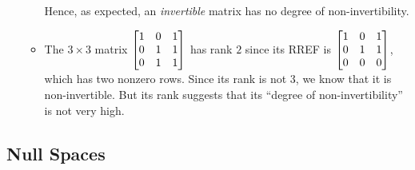 \begin{enumerate}
\begin{itemize}
Hence, as expected, an \emph{invertible} matrix has no degree of
non-invertibility.
\item The \(3\times 3\) matrix \(\mqty[1&0&1\\ 0&1&1\\ 0&1&1]\) has rank \(2\)
since its RREF is \(\mqty[1&0&1\\ 0&1&1\\ 0&0&0]\), which has two nonzero rows.
Since its rank is not \(3\), we know that it is non-invertible. But its rank
suggests that its ``degree of non-invertibility'' is not very high.
\end{itemize}
\end{enumerate}
\subsection{Null Spaces}
\label{subsect:null-sp}
